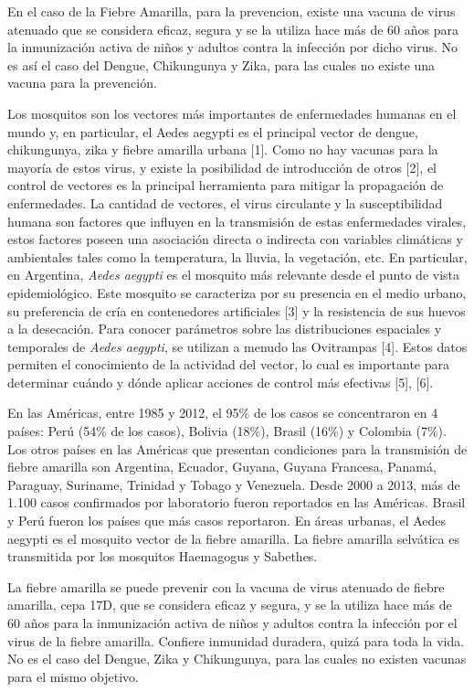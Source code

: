 \par En el caso de la Fiebre Amarilla, para la prevencion, existe una vacuna de
virus atenuado que se considera eficaz, segura y se la utiliza hace más
de 60 años para la inmunización activa de niños y adultos contra la infección
por dicho virus. No es así el caso del Dengue, Chikungunya y Zika, para las
cuales no existe una vacuna para la prevención.


Los mosquitos son los vectores más importantes de enfermedades humanas en el
mundo y, en particular, el Aedes aegypti es el principal vector de dengue,
chikungunya, zika y fiebre amarilla urbana [1]. Como no hay vacunas para la
mayoría de estos virus, y existe la posibilidad de introducción de otros [2],
el control de vectores es la principal herramienta para mitigar la
propagación de enfermedades. La cantidad de vectores, el virus circulante y la
susceptibilidad humana son factores que influyen en la transmisión de estas
enfermedades virales, estos factores poseen una asociación directa o indirecta
con variables climáticas y ambientales tales como la temperatura, la lluvia,
la vegetación, etc. En particular, en Argentina, \textit{Aedes aegypti} es el
mosquito más relevante desde el punto de vista epidemiológico.
Este mosquito se caracteriza por su presencia en el medio urbano, su preferencia
de cría en contenedores artificiales [3] y la resistencia de sus huevos a la
desecación. Para conocer parámetros sobre las distribuciones espaciales y temporales
de \textit{Aedes aegypti}, se utilizan a menudo las Ovitrampas [4].
Estos datos permiten el conocimiento de la actividad del vector, lo cual es importante para determinar cuándo y
dónde aplicar acciones de control más efectivas [5], [6].




En las Américas, entre 1985 y 2012, el 95\% de los casos se concentraron en
4 países: Perú (54\% de los casos), Bolivia (18\%), Brasil (16\%) y Colombia (7\%).
Los otros países en las Américas que presentan condiciones para la transmisión
de fiebre amarilla son Argentina, Ecuador, Guyana, Guyana Francesa, Panamá,
Paraguay, Suriname, Trinidad y Tobago y Venezuela.
Desde 2000 a 2013, más de 1.100 casos confirmados por laboratorio fueron
reportados en las Américas. Brasil y Perú fueron los países que más casos
reportaron. En áreas urbanas, el Aedes aegypti es el mosquito vector de la
fiebre amarilla. La fiebre amarilla selvática es transmitida por los mosquitos
Haemagogus y Sabethes.

La fiebre amarilla se puede prevenir con la vacuna de virus atenuado de fiebre
amarilla, cepa 17D, que se considera eficaz y segura, y se la utiliza hace más
de 60 años para la inmunización activa de niños y adultos contra la infección
por el virus de la fiebre amarilla. Confiere inmunidad duradera, quizá para toda
la vida. No es el caso del Dengue, Zika y Chikungunya, para las cuales no existen
vacunas para el mismo objetivo.


